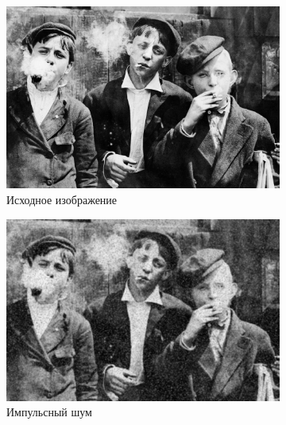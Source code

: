   \begin{figure}[ht!] 
    \centering
    \begin{subfigure}[b]{0.5\linewidth}
        \centering
        \includegraphics[width=0.95\linewidth]{../lewis-hine-taschen-main-3.jpg} 
        \caption{Исходное изображение} 
        \label{gaussian_7:a} 
        \vspace{4ex}
    \end{subfigure}%
    \begin{subfigure}[b]{0.5\linewidth}
      \centering
      \includegraphics[width=0.95\linewidth]{../Gaussian_Blur/Gaussian_Blur_Impulse_noise_(7,7).jpg} 
      \caption{Импульсный шум} 
      \label{gaussian_7:b} 
      \vspace{4ex}
    \end{subfigure}
    \begin{subfigure}[b]{0.5\linewidth}
      \centering

\end{subfigure}
\end{figure}
